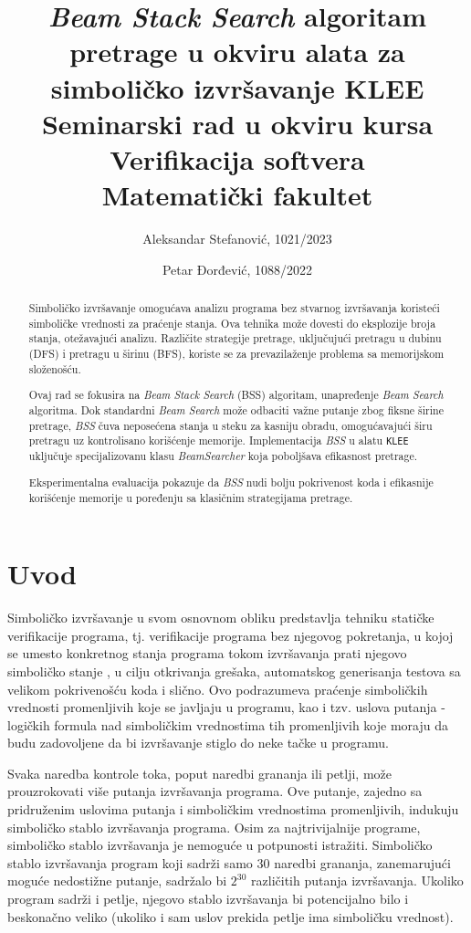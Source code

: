 \documentclass[a4paper]{article}
\title{\textit{Beam Stack Search} algoritam pretrage u okviru alata za simboličko izvršavanje KLEE\\ \small{Seminarski rad u okviru kursa\\Verifikacija softvera\\Matematički fakultet}}
\author{Aleksandar Stefanović, 1021/2023 \and Petar Đorđević, 1088/2022}
\begin{document}
\maketitle

\begin{abstract}

Simboličko izvršavanje omogućava analizu programa bez stvarnog izvršavanja koristeći simboličke vrednosti za praćenje stanja. Ova tehnika može dovesti do eksplozije broja stanja, otežavajući analizu. Različite strategije pretrage, uključujući pretragu u dubinu (DFS) i pretragu u širinu (BFS), koriste se za prevazilaženje problema sa memorijskom složenošću.

Ovaj rad se fokusira na \textit{Beam Stack Search} (BSS) algoritam, unapređenje \textit{Beam Search} algoritma. Dok standardni \textit{Beam Search} može odbaciti važne putanje zbog fiksne širine pretrage, \textit{BSS} čuva neposećena stanja u steku za kasniju obradu, omogućavajući širu pretragu uz kontrolisano korišćenje memorije. Implementacija \textit{BSS} u alatu \verb|KLEE| uključuje specijalizovanu klasu \emph{BeamSearcher} koja poboljšava efikasnost pretrage.

Eksperimentalna evaluacija pokazuje da \textit{BSS} nudi bolju pokrivenost koda i efikasnije korišćenje memorije u poređenju sa klasičnim strategijama pretrage.

\end{abstract}

\tableofcontents

\newpage

\section{Uvod}

Simboličko izvršavanje u svom osnovnom obliku predstavlja tehniku statičke verifikacije programa, tj. verifikacije programa bez njegovog pokretanja, u kojoj se umesto konkretnog stanja programa tokom izvršavanja prati njegovo simboličko stanje \cite{SymExec-King-10.1145/360248.360252}, u cilju otkrivanja grešaka, automatskog generisanja testova sa velikom pokrivenošću koda i slično. Ovo podrazumeva praćenje simboličkih vrednosti promenljivih koje se javljaju u programu, kao i tzv. uslova putanja - logičkih formula nad simboličkim vrednostima tih promenljivih koje moraju da budu zadovoljene da bi izvršavanje stiglo do neke tačke u programu.

Svaka naredba kontrole toka, poput naredbi grananja ili petlji, može prouzrokovati više putanja izvršavanja programa. Ove putanje, zajedno sa pridruženim uslovima putanja i simboličkim vrednostima promenljivih, indukuju simboličko stablo izvršavanja programa. Osim za najtrivijalnije programe, simboličko stablo izvršavanja je nemoguće u potpunosti istražiti. Simboličko stablo izvršavanja program koji sadrži samo $30$ naredbi grananja, zanemarujući moguće nedostižne putanje, sadržalo bi $2^{30}$ različitih putanja izvršavanja. Ukoliko program sadrži i petlje, njegovo stablo izvršavanja bi potencijalno bilo i beskonačno veliko (ukoliko i sam uslov prekida petlje ima simboličku vrednost).
\end{document}
